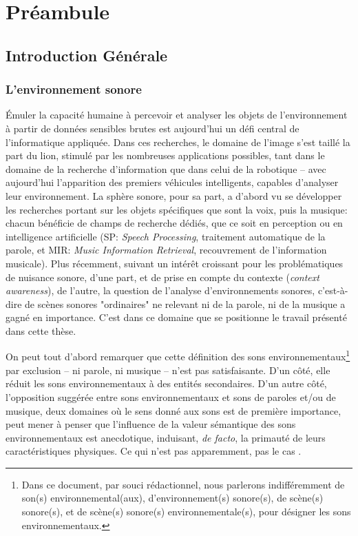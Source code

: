 \chapter{Préambule}\label{ch:pream_intro}


\section{Introduction Générale}

\subsection{L'environnement sonore}

Émuler la capacité humaine à percevoir et analyser les objets de l'environnement à partir de données sensibles brutes est aujourd'hui un défi central de l'informatique appliquée. Dans ces recherches, le domaine de l'image s'est taillé la part du lion, stimulé par les nombreuses applications possibles, tant dans le domaine de la recherche d'information que dans celui de la robotique -- avec aujourd'hui l'apparition des premiers véhicules intelligents, capables d'analyser leur environnement. La sphère sonore, pour sa part, a d'abord vu se développer les recherches portant sur les objets spécifiques que sont la voix, puis la musique: chacun bénéficie de champs de recherche dédiés, que ce soit en perception ou en intelligence artificielle (SP: \emph{Speech Processing}, traitement automatique de la parole, et MIR: \emph{Music Information Retrieval}, recouvrement de l'information musicale). Plus récemment, suivant un intérêt croissant pour les problématiques de nuisance sonore, d'une part, et de prise en compte du contexte (\emph{context awareness}), de l'autre, la question de l'analyse d'environnements sonores, c'est-à-dire de scènes sonores "ordinaires" ne relevant ni de la parole, ni de la musique a gagné en importance. C'est dans ce domaine que se positionne le travail présenté dans cette thèse.

On peut tout d'abord remarquer que cette définition des sons environnementaux\footnote{Dans ce document, par souci rédactionnel, nous parlerons indifféremment de son(s) environnemental(aux), d'environnement(s) sonore(s), de scène(s) sonore(s), et de scène(s) sonore(s) environnementale(s), pour désigner les sons environnementaux.} par exclusion -- ni parole, ni musique -- n'est pas satisfaisante. D'un côté, elle réduit les sons environnementaux à des entités secondaires. D'un autre côté, l'opposition suggérée entre sons environnementaux et sons de paroles et/ou de musique, deux domaines où le sens donné aux sons est de première importance, peut mener à penser que l'influence de la valeur sémantique des sons environnementaux est anecdotique, induisant, \emph{de facto}, la primauté de leurs caractéristiques physiques. Ce qui n'est pas apparemment, pas le cas \citep{ballas1987interpreting}.

